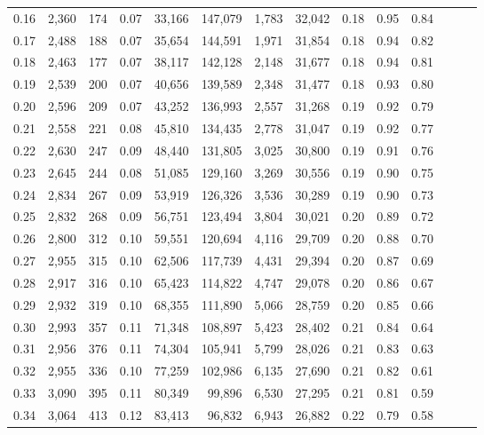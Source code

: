 \begin{tabular}{rrrrrrrrrrrrrr}
0.16 &  2,360 &    174 &  0.07 &   33,166 &  147,079 &   1,783 &  32,042 &  0.18 &  0.95 &      0.84 \\
0.17 &  2,488 &    188 &  0.07 &   35,654 &  144,591 &   1,971 &  31,854 &  0.18 &  0.94 &      0.82 \\
0.18 &  2,463 &    177 &  0.07 &   38,117 &  142,128 &   2,148 &  31,677 &  0.18 &  0.94 &      0.81 \\
0.19 &  2,539 &    200 &  0.07 &   40,656 &  139,589 &   2,348 &  31,477 &  0.18 &  0.93 &      0.80 \\
0.20 &  2,596 &    209 &  0.07 &   43,252 &  136,993 &   2,557 &  31,268 &  0.19 &  0.92 &      0.79 \\
0.21 &  2,558 &    221 &  0.08 &   45,810 &  134,435 &   2,778 &  31,047 &  0.19 &  0.92 &      0.77 \\
0.22 &  2,630 &    247 &  0.09 &   48,440 &  131,805 &   3,025 &  30,800 &  0.19 &  0.91 &      0.76 \\
0.23 &  2,645 &    244 &  0.08 &   51,085 &  129,160 &   3,269 &  30,556 &  0.19 &  0.90 &      0.75 \\
0.24 &  2,834 &    267 &  0.09 &   53,919 &  126,326 &   3,536 &  30,289 &  0.19 &  0.90 &      0.73 \\
0.25 &  2,832 &    268 &  0.09 &   56,751 &  123,494 &   3,804 &  30,021 &  0.20 &  0.89 &      0.72 \\
0.26 &  2,800 &    312 &  0.10 &   59,551 &  120,694 &   4,116 &  29,709 &  0.20 &  0.88 &      0.70 \\
0.27 &  2,955 &    315 &  0.10 &   62,506 &  117,739 &   4,431 &  29,394 &  0.20 &  0.87 &      0.69 \\
0.28 &  2,917 &    316 &  0.10 &   65,423 &  114,822 &   4,747 &  29,078 &  0.20 &  0.86 &      0.67 \\
0.29 &  2,932 &    319 &  0.10 &   68,355 &  111,890 &   5,066 &  28,759 &  0.20 &  0.85 &      0.66 \\
0.30 &  2,993 &    357 &  0.11 &   71,348 &  108,897 &   5,423 &  28,402 &  0.21 &  0.84 &      0.64 \\
0.31 &  2,956 &    376 &  0.11 &   74,304 &  105,941 &   5,799 &  28,026 &  0.21 &  0.83 &      0.63 \\
0.32 &  2,955 &    336 &  0.10 &   77,259 &  102,986 &   6,135 &  27,690 &  0.21 &  0.82 &      0.61 \\
0.33 &  3,090 &    395 &  0.11 &   80,349 &   99,896 &   6,530 &  27,295 &  0.21 &  0.81 &      0.59 \\
0.34 &  3,064 &    413 &  0.12 &   83,413 &   96,832 &   6,943 &  26,882 &  0.22 &  0.79 &      0.58 \\

\end{tabular}
